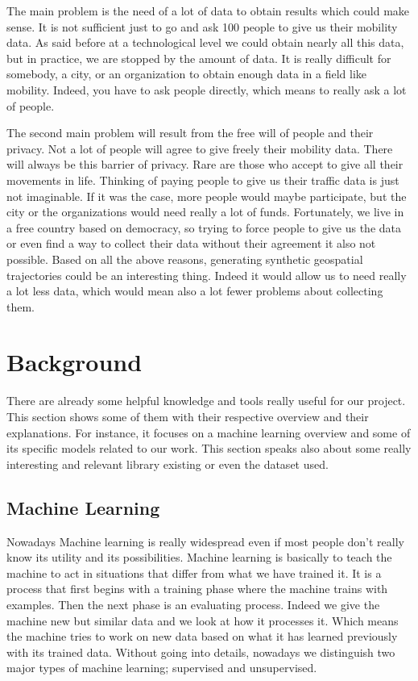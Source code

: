 \documentclass[a4]{article}
\begin{document}
The main problem is the need of a lot of data to obtain results which could make sense. It is not sufficient just to go and ask 100 people to give us their mobility data. As said before at a technological level we could obtain nearly all this data, but in practice, we are stopped by the amount of data. It is really difficult for somebody, a city, or an organization to obtain enough data in a field like mobility. Indeed, you have to ask people directly, which means to really ask a lot of people.

The second main problem will result from the free will of people and their privacy. Not a lot of people will agree to give freely their mobility data. There will always be this barrier of privacy. Rare are those who accept to give all their movements in life. Thinking of paying people to give us their traffic data is just not imaginable. If it was the case, more people would maybe participate, but the city or the organizations would need really a lot of funds. Fortunately, we live in a free country based on democracy, so trying to force people to give us the data or even find a way to collect their data without their agreement it also not possible. Based on all the above reasons, generating synthetic geospatial trajectories could be an interesting thing. Indeed it would allow us to need really a lot less data, which would mean also a lot fewer problems about collecting them.


\newpage
\section{Background}%
There are already some helpful knowledge and tools really useful for our project. This section shows some of them with their respective overview and their explanations. For instance, it focuses on a machine learning overview and some of its specific models related to our work. This section speaks also about some really interesting and relevant library existing or even the dataset used.

\subsection{Machine Learning}
Nowadays Machine learning is really widespread even if most people don't really know its utility and its possibilities. Machine learning is basically to teach the machine to act in situations that differ from what we have trained it. It is a process that first begins with a training phase where the machine trains with examples. Then the next phase is an evaluating process. Indeed we give the machine new but similar data and we look at how it processes it. Which means the machine tries to work on new data based on what it has learned previously with its trained data. Without going into details, nowadays we distinguish two major types of machine learning; supervised and unsupervised.
\end{document}
